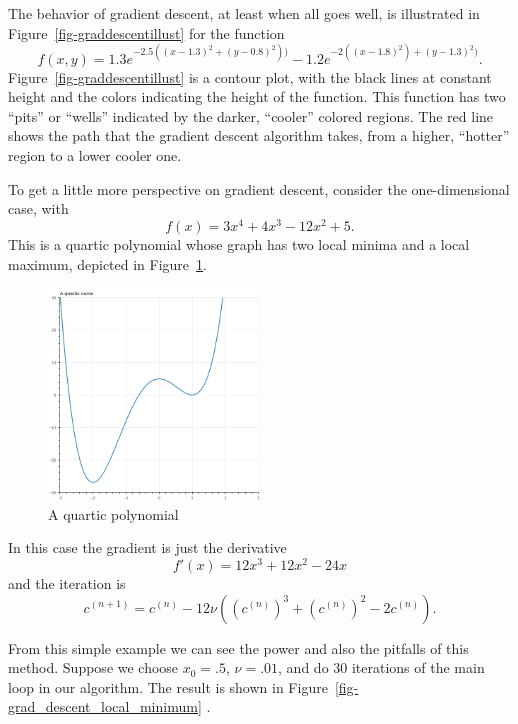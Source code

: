 \documentclass[
  11pt,
  letterpaper,
]{scrbook}
\theoremstyle{plain}
\theoremstyle{plain}
\theoremstyle{remark}
\begin{document}
The behavior of gradient descent, at least when all goes well, is
illustrated in Figure~\ref{fig-graddescentillust} for the function \[
f(x,y) = 1.3e^{-2.5((x-1.3)^2+(y-0.8)^2))}-1.2e^{-2((x-1.8)^2)+(y-1.3)^2)}.
\] Figure~\ref{fig-graddescentillust} is a contour plot, with the black
lines at constant height and the colors indicating the height of the
function. This function has two ``pits'' or ``wells'' indicated by the
darker, ``cooler'' colored regions. The red line shows the path that the
gradient descent algorithm takes, from a higher, ``hotter'' region to a
lower cooler one.

To get a little more perspective on gradient descent, consider the
one-dimensional case, with \[
f(x)=3x^4+4x^3-12x^2+5.
\] This is a quartic polynomial whose graph has two local minima and a
local maximum, depicted in Figure~\ref{fig-graddescentquartic}.

\begin{figure}

{\centering \includegraphics[width=0.5\textwidth,height=\textheight]{chapters/img/GradDescentQuartic.png}

}

\caption{\label{fig-graddescentquartic}A quartic polynomial}

\end{figure}

In this case the gradient is just the derivative \[
f'(x)=12x^3+12x^2-24x
\] and the iteration is \[
c^{(n+1)} = c^{(n)}-12\nu((c^{(n)})^3+(c^{(n)})^2-2c^{(n)}).
\]

From this simple example we can see the power and also the pitfalls of
this method. Suppose we choose \(x_0=.5\), \(\nu=.01\), and do \(30\)
iterations of the main loop in our algorithm. The result is shown in
Figure~\ref{fig-grad_descent_local_minimum} .
\end{document}
